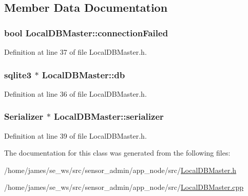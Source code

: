 \subsection{Member Data Documentation}
\hypertarget{class_local_d_b_master_ad32223fcc415e725ba98d63ff05af804}{
\subsubsection[{connection\-Failed}]{\setlength{\rightskip}{0pt plus 5cm}bool Local\-D\-B\-Master\-::connection\-Failed\hspace{0.3cm}{\ttfamily [private]}}}\label{class_local_d_b_master_ad32223fcc415e725ba98d63ff05af804}


Definition at line 37 of file Local\-D\-B\-Master.\-h.

\hypertarget{class_local_d_b_master_a487edf3627d687bcb41fe135a8e8a322}{
\subsubsection[{db}]{\setlength{\rightskip}{0pt plus 5cm}sqlite3 $\ast$ Local\-D\-B\-Master\-::db\hspace{0.3cm}{\ttfamily [private]}}}\label{class_local_d_b_master_a487edf3627d687bcb41fe135a8e8a322}


Definition at line 36 of file Local\-D\-B\-Master.\-h.

\hypertarget{class_local_d_b_master_a74986c5c4a8d5d33ab00719824589ce0}{
\subsubsection[{serializer}]{\setlength{\rightskip}{0pt plus 5cm}Serializer $\ast$ Local\-D\-B\-Master\-::serializer\hspace{0.3cm}{\ttfamily [private]}}}\label{class_local_d_b_master_a74986c5c4a8d5d33ab00719824589ce0}


Definition at line 39 of file Local\-D\-B\-Master.\-h.



The documentation for this class was generated from the following files\-:\begin{DoxyCompactItemize}
\item 
/home/james/se\-\_\-ws/src/sensor\-\_\-admin/app\-\_\-node/src/\hyperlink{app__node_2src_2_local_d_b_master_8h}{Local\-D\-B\-Master.\-h}\item 
/home/james/se\-\_\-ws/src/sensor\-\_\-admin/app\-\_\-node/src/\hyperlink{app__node_2src_2_local_d_b_master_8cpp}{Local\-D\-B\-Master.\-cpp}\end{DoxyCompactItemize}
